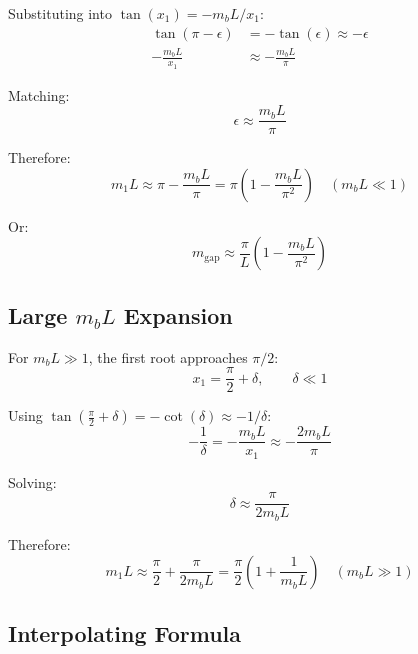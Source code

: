\documentclass[11pt,a4paper]{article}
\newcommand{\mgap}{m_{\mathrm{gap}}}
\newcommand{\mb}{m_b}
\theoremstyle{definition}
\theoremstyle{plain}
\theoremstyle{remark}
\begin{document}
Substituting into $\tan(x_1) = -\mb L/x_1$:
\begin{align}
\tan(\pi - \epsilon) &= -\tan(\epsilon) \approx -\epsilon \label{eq:tan-expansion} \\
-\frac{\mb L}{x_1} &\approx -\frac{\mb L}{\pi} \label{eq:rhs-expansion}
\end{align}

Matching:
\begin{equation}
\epsilon \approx \frac{\mb L}{\pi}
\label{eq:epsilon-result}
\end{equation}

Therefore:
\begin{equation}
\boxed{m_1 L \approx \pi - \frac{\mb L}{\pi} = \pi\left(1 - \frac{\mb L}{\pi^2}\right) \quad (\mb L \ll 1)}
\label{eq:gap-small-mb}
\end{equation}

Or:
\begin{equation}
\mgap \approx \frac{\pi}{L}\left(1 - \frac{\mb L}{\pi^2}\right)
\label{eq:gap-small-mb-2}
\end{equation}

\subsection{Large $\mb L$ Expansion}

For $\mb L \gg 1$, the first root approaches $\pi/2$:
\begin{equation}
x_1 = \frac{\pi}{2} + \delta, \qquad \delta \ll 1
\label{eq:large-mb-ansatz}
\end{equation}

Using $\tan(\tfrac{\pi}{2} + \delta) = -\cot(\delta) \approx -1/\delta$:
\begin{equation}
-\frac{1}{\delta} = -\frac{\mb L}{x_1} \approx -\frac{2\mb L}{\pi}
\label{eq:large-mb-match}
\end{equation}

Solving:
\begin{equation}
\delta \approx \frac{\pi}{2\mb L}
\label{eq:delta-result}
\end{equation}

Therefore:
\begin{equation}
\boxed{m_1 L \approx \frac{\pi}{2} + \frac{\pi}{2\mb L} = \frac{\pi}{2}\left(1 + \frac{1}{\mb L}\right) \quad (\mb L \gg 1)}
\label{eq:gap-large-mb}
\end{equation}

\subsection{Interpolating Formula}
\end{document}
